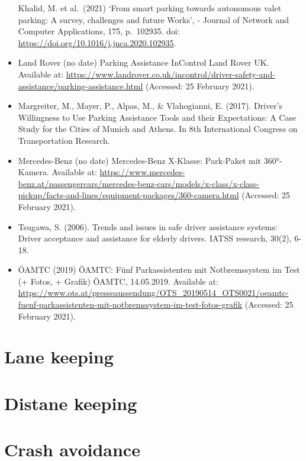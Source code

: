\documentclass[
]{book}
\begin{document}
\begin{itemize}
  Khalid, M. et al.~(2021) `From smart parking towards autonomous valet parking: A survey, challenges and future Works', - Journal of Network and Computer Applications, 175, p.~102935. doi: \url{https://doi.org/10.1016/j.jnca.2020.102935}.
\item
  Land Rover (no date) Parking Assistance \textbar{} InControl \textbar{} Land Rover UK. Available at: \url{https://www.landrover.co.uk/incontrol/driver-safety-and-assistance/parking-assistance.html} (Accessed: 25 February 2021).
\item
  Margreiter, M., Mayer, P., Alpas, M., \& Vlahogianni, E. (2017). Driver's Willingness to Use Parking Assistance Tools and their Expectations: A Case Study for the Cities of Munich and Athens. In 8th International Congress on Transportation Research.
\item
  Mercedes-Benz (no date) Mercedes-Benz X-Klasse: Park-Paket mit 360°-Kamera. Available at: \url{https://www.mercedes-benz.at/passengercars/mercedes-benz-cars/models/x-class/x-class-pickup/facts-and-lines/equipment-packages/360-camera.html} (Accessed: 25 February 2021).
\item
  Tsugawa, S. (2006). Trends and issues in safe driver assistance systems: Driver acceptance and assistance for elderly drivers. IATSS research, 30(2), 6-18.
\item
  ÖAMTC (2019) ÖAMTC: Fünf Parkassistenten mit Notbremssystem im Test (+ Fotos, + Grafik) \textbar{} ÖAMTC, 14.05.2019. Available at: \url{https://www.ots.at/presseaussendung/OTS_20190514_OTS0021/oeamtc-fuenf-parkassistenten-mit-notbremssystem-im-test-fotos-grafik} (Accessed: 25 February 2021).
\end{itemize}

\hypertarget{lane-keeping}{%
\section{Lane keeping}\label{lane-keeping}}

\hypertarget{distane-keeping}{%
\section{Distane keeping}\label{distane-keeping}}

\hypertarget{crash-avoidance}{%
\section{Crash avoidance}\label{crash-avoidance}}
\end{document}
